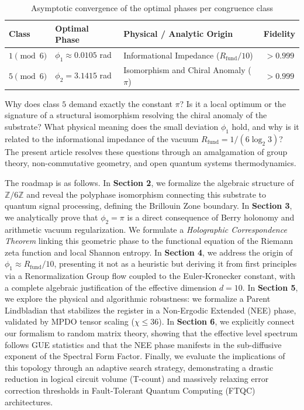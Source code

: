 \documentclass[12pt,a4paper]{article}
\theoremstyle{plain}
\theoremstyle{definition}
\theoremstyle{remark}
\begin{document}
\begin{table}[H]
\centering
\caption{Asymptotic convergence of the optimal phases per congruence class}
\label{tab:fases}
\begin{tabular}{lllc}
\toprule
\textbf{Class} & \textbf{Optimal Phase} & \textbf{Physical / Analytic Origin} & \textbf{Fidelity} \\
\midrule
$1 \pmod 6$ & $\phi_1 \approx 0.0105$ rad & Informational Impedance ($R_{\text{fund}}/10$) & $> 0.999$ \\
$5 \pmod 6$ & $\phi_2 = 3.1415$ rad & Isomorphism and Chiral Anomaly ($\pi$) & $> 0.999$ \\
\bottomrule
\end{tabular}
\end{table}

Why does class $5$ demand exactly the constant $\pi$? Is it a local optimum or the signature of a structural isomorphism resolving the chiral anomaly of the substrate? What physical meaning does the small deviation $\phi_1$ hold, and why is it related to the informational impedance of the vacuum $R_{\text{fund}} = 1/(6\log_2 3)$? The present article resolves these questions through an amalgamation of group theory, non-commutative geometry, and open quantum systems thermodynamics.

The roadmap is as follows. In \textbf{Section 2}, we formalize the algebraic structure of $\mathbb{Z}/6\mathbb{Z}$ and reveal the polyphase isomorphism connecting this substrate to quantum signal processing, defining the Brillouin Zone boundary. In \textbf{Section 3}, we analytically prove that $\phi_2 = \pi$ is a direct consequence of Berry holonomy and arithmetic vacuum regularization. We formulate a \textit{Holographic Correspondence Theorem} linking this geometric phase to the functional equation of the Riemann zeta function and local Shannon entropy. In \textbf{Section 4}, we address the origin of $\phi_1 \approx R_{\text{fund}}/10$, presenting it not as a heuristic but deriving it from first principles via a Renormalization Group flow coupled to the Euler-Kronecker constant, with a complete algebraic justification of the effective dimension $d=10$. In \textbf{Section 5}, we explore the physical and algorithmic robustness: we formalize a Parent Lindbladian that stabilizes the register in a Non-Ergodic Extended (NEE) phase, validated by MPDO tensor scaling ($\chi \le 36$). In \textbf{Section 6}, we explicitly connect our formalism to random matrix theory, showing that the effective level spectrum follows GUE statistics and that the NEE phase manifests in the sub-diffusive exponent of the Spectral Form Factor. Finally, we evaluate the implications of this topology through an adaptive search strategy, demonstrating a drastic reduction in logical circuit volume (T-count) and massively relaxing error correction thresholds in Fault-Tolerant Quantum Computing (FTQC) architectures.
\end{document}
